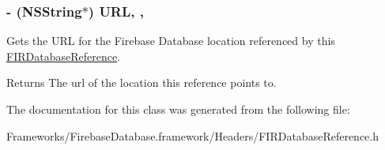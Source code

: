 \subsubsection[{U\+R\+L}]{\setlength{\rightskip}{0pt plus 5cm}-\/ (N\+S\+String$\ast$) U\+R\+L\hspace{0.3cm}{\ttfamily [read]}, {\ttfamily [nonatomic]}, {\ttfamily [strong]}}\label{interface_f_i_r_database_reference_a6fd5f81300be3842a8a3c856a89d000d}
Gets the U\+R\+L for the Firebase Database location referenced by this \hyperlink{interface_f_i_r_database_reference}{F\+I\+R\+Database\+Reference}.

\begin{DoxyReturn}{Returns}
The url of the location this reference points to. 
\end{DoxyReturn}


The documentation for this class was generated from the following file\+:\begin{DoxyCompactItemize}
\item 
Frameworks/\+Firebase\+Database.\+framework/\+Headers/F\+I\+R\+Database\+Reference.\+h\end{DoxyCompactItemize}
